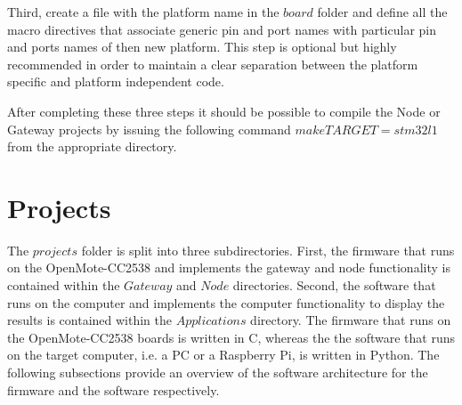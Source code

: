 Third, create a file with the platform name in the $board$ folder and define all the macro directives that associate generic pin and port names with particular pin and ports names of then new platform. This step is optional but highly recommended in order to maintain a clear separation between the platform specific and platform independent code.

After completing these three steps it should be possible to compile the Node or Gateway projects by issuing the following command $make TARGET=stm32l1$ from the appropriate directory. 

\section{Projects}
The $projects$ folder is split into three subdirectories. First, the firmware that runs on the OpenMote-CC2538 and implements the gateway and node functionality is contained within the $Gateway$ and $Node$ directories. Second, the software that runs on the computer and implements the computer functionality to display the results is contained within the $Applications$ directory. The firmware that runs on the OpenMote-CC2538 boards is written in C, whereas the the software that runs on the target computer, i.e. a PC or a Raspberry Pi, is written in Python. The following subsections provide an overview of the software architecture for the firmware and the software respectively.


